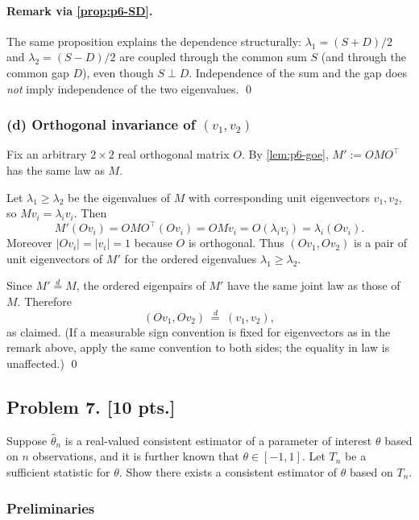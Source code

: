 \documentclass[11pt,a4paper]{article}
\begin{document}
\paragraph{Remark via \cref{prop:p6-SD}.}
The same proposition explains the dependence structurally: \(\lambda_1=(S+D)/2\) and \(\lambda_2=(S-D)/2\) are coupled through the common sum \(S\) (and through the common gap \(D\)), even though \(S\perp D\). Independence of the sum and the gap does \emph{not} imply independence of the two eigenvalues.
\qed

\subsubsection{(d) Orthogonal invariance of \((v_1,v_2)\)}

Fix an arbitrary \(2\times 2\) real orthogonal matrix \(O\). By \cref{lem:p6-goe}, \(M':=OMO^\top\) has the same law as \(M\).

Let \(\lambda_1\ge\lambda_2\) be the eigenvalues of \(M\) with corresponding unit eigenvectors \(v_1,v_2\), so \(Mv_i=\lambda_i v_i\). Then
\[
M'(Ov_i)
=
OMO^\top(Ov_i)
=
OM v_i
=
O(\lambda_i v_i)
=
\lambda_i(Ov_i).
\]
Moreover \(\lvert Ov_i\rvert=\lvert v_i\rvert=1\) because \(O\) is orthogonal. Thus \((Ov_1,Ov_2)\) is a pair of unit eigenvectors of \(M'\) for the ordered eigenvalues \(\lambda_1\ge\lambda_2\).

Since \(M'\stackrel{d}{=}M\), the ordered eigenpairs of \(M'\) have the same joint law as those of \(M\). Therefore
\[
(Ov_1,Ov_2)
\ \stackrel{d}{=}\
(v_1,v_2),
\]
as claimed. (If a measurable sign convention is fixed for eigenvectors as in the remark above, apply the same convention to both sides; the equality in law is unaffected.)
\qed

\subsection{Problem 7. [10 pts.]}
Suppose \( \hat{\theta}_n \) is a real-valued consistent estimator of a parameter of interest \( \theta \) based on \( n \) observations, and it is further known that \( \theta \in [-1, 1] \). Let \( T_n \) be a sufficient statistic for \( \theta \). Show there exists a consistent estimator of \( \theta \) based on \( T_n \).

\setcounter{section}{7}
\setcounter{theorem}{0}
\setcounter{definition}{0}
\setcounter{remark}{0}
\setcounter{note}{0}

\subsubsection{Preliminaries}
\end{document}
